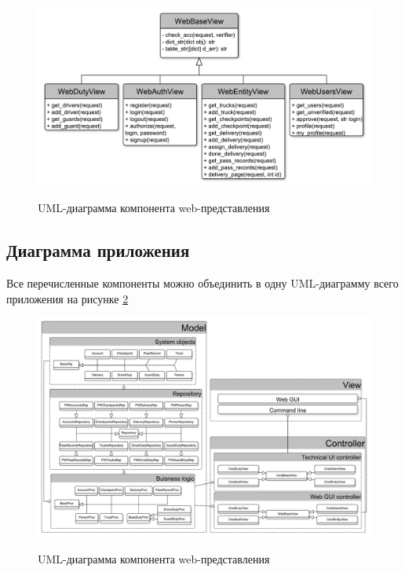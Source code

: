 \begin{figure}[h!] 
	\begin{center}
		{\includegraphics[scale=0.5, angle=0]{uml/webGUI.pdf}}
		\caption{UML-диаграмма компонента web-представления}
		\label{view_pic}
	\end{center}
\end{figure}

\newpage
\subsection{Диаграмма приложения}
Все перечисленные компоненты можно объединить в одну UML-диаграмму всего приложения на рисунке \ref{alluml_pic}

\begin{figure}[h!] 
	\begin{center}
		{\includegraphics[scale=0.36, angle=-90]{uml/components.pdf}}
		\caption{UML-диаграмма компонента web-представления}
		\label{alluml_pic}
	\end{center}
\end{figure}

